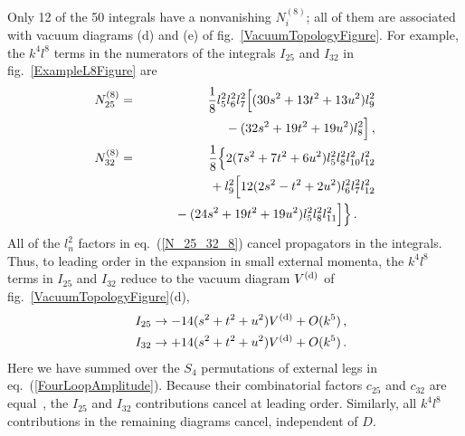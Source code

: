 \documentclass[aps,prl,twocolumn,groupedaddress,draft,showpacs,nofootinbib]{revtex4}
\def\fig#1{fig.~{\ref{#1}}}
\def\nn{\nonumber}
\def\eqn#1{eq.~(\ref{#1})}
\begin{document}
Only 12 of the 50 integrals have a nonvanishing $N_i^{(8)}$; all of
them are associated with vacuum diagrams (d) and (e) of
\fig{VacuumTopologyFigure}.
For example, the $k^4 l^8$ terms in the numerators of  
the integrals $I_{25}$ and $I_{32}$ in \fig{ExampleL8Figure} are
%
\begin{eqnarray}
N_{25}^{(8)}
&=& \frac{1}{8} l^2_{5} l^2_{6} l^2_{7} 
 \Bigl[ (30 s^2 + 13 t^2 + 13 u^2)l^2_{9}  \nn \\ 
&& \hskip 1.1 cm \null
-(32 s^2 + 19 t^2 + 19 u^2) l^2_{8} \Bigr] \,, 
\nn \\ 
N_{32}^{(8)} 
&=& \frac{1}{8} \Bigl\{ 2 (7 s^2 + 7 t^2 + 6 u^2) 
               l^2_{5} l^2_{8} l^2_{10} l^2_{12} \nn \\ 
&& \hskip.1cm \null
+ l^2_{9} \Bigl[ 
12 (2 s^2 - t^2 + 2 u^2) l^2_{6} l^2_{7} l^2_{12} \nn \\ 
&& \hskip.8cm \null
- (24 s^2 + 19 t^2 + 19 u^2) l^2_{5} l^2_{8} l^2_{11} \Bigr] \Bigr\}
\,.  \hskip .5 cm 
\label{N_25_32_8}
\end{eqnarray}
%
All of the $l_n^2$ factors in \eqn{N_25_32_8} cancel
propagators in the integrals. Thus, to leading order in the expansion 
in small external momenta, the $k^4 l^8$ terms in $I_{25}$ and $I_{32}$
reduce to the vacuum diagram $V^{\rm (d)}$ of
\fig{VacuumTopologyFigure}(d),
%
\begin{eqnarray}
&&
I_{25}\rightarrow -14 (s^2+t^2+u^2) V^{\rm (d)} +O(k^5) \,, \nn \\ &&
I_{32}\rightarrow +14 (s^2+t^2+u^2) V^{\rm (d)}+O(k^5) \,.
\end{eqnarray}
%
Here we have summed over the $S_4$ permutations of external legs in
\eqn{FourLoopAmplitude}. Because their combinatorial factors $c_{25}$ 
and $c_{32}$ are equal~\cite{WebResult},
the $I_{25}$ and $I_{32}$ contributions cancel at leading order.
Similarly, all $k^4 l^8$
contributions in the remaining diagrams cancel, independent of $D$.
\end{document}

